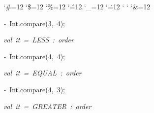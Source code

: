 \begin{list}{}
{\setlength{\leftmargin}{\leftmargini}
\setlength{\rightmargin}{0cm}
\setlength{\itemindent}{0cm}
\setlength{\listparindent}{0cm}
\setlength{\itemsep}{0cm}
\setlength{\parsep}{0cm}
\setlength{\labelsep}{0cm}
\setlength{\labelwidth}{0cm}
\catcode`\#=12
\catcode`\$=12
\catcode`\%=12
\catcode`\^=12
\catcode`\_=12
\catcode`\.=12
\catcode`
\catcode`
\catcode`\&=12
\ttfamily}
\small
\item[]\textsl{-\ }Int.compare(3,\ 4);
\item[]\textsl{val\ it\ =\ LESS\ :\ order}
\item[]\textsl{-\ }Int.compare(4,\ 4);
\item[]\textsl{val\ it\ =\ EQUAL\ :\ order}
\item[]\textsl{-\ }Int.compare(4,\ 3);
\item[]\textsl{val\ it\ =\ GREATER\ :\ order}
\end{list}

